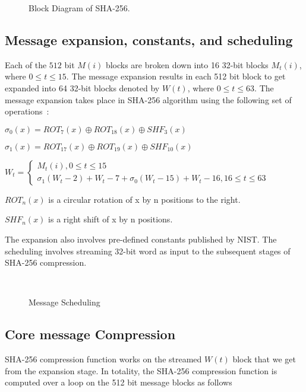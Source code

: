 \begin{figure}[ht]
	\begin{center}
	\end{center}
	\vspace{-1ex}
	\caption{Block Diagram of SHA-256. 
		\label{SHAblockdiagram}}
	\vspace{-4ex}
\end{figure}


\subsection{Message expansion, constants, and scheduling}
Each of the $512$ bit $M(i)$ blocks are broken down into 16 32-bit blocks $M_{t}(i)$, where $0 \leq t \leq 15$. The message expansion results in each 512 bit block to get expanded into 64 32-bit blocks denoted by $W(t)$, where $0 \leq t \leq 63$. The message expansion takes place in SHA-256 algorithm using the following set of operations~\cite{FPGA}:

$\sigma_{0} (x) = ROT_{7}(x) \oplus ROT_{18}(x) \oplus SHF_{3}(x) $

$\sigma_{1}(x) = ROT_{17}(x) \oplus ROT_{19}(x) \oplus SHF_{10}(x)$
 
$W_{t} = \begin{cases} 
	M_{t}(i), 0 \leq t \leq 15 \\
	\sigma_{1}(W_{t} - 2) + W_{t} − 7 + \sigma_{0}(W_{t} − 15) + W_{t}-16, 16 \leq t \leq 63  
\end{cases}$

$ROT_{n}(x)$ is a circular rotation of x by n positions to the right.

$SHF_{n}(x)$ is a right shift of x by n positions. 

The expansion also involves pre-defined constants published by NIST. The scheduling involves streaming 32-bit word as input to the subsequent stages of SHA-256 compression.
\begin{figure}[ht]
	\begin{center}
	\end{center}
	\vspace{-1ex}
	\caption{Message Scheduling 
		\label{Message Scheduling}}
	\vspace{-4ex} ~\cite{SHA-256}
\end{figure}
\subsection{Core message Compression}
SHA-256 compression function works on the streamed $W(t)$ block that we get from the expansion stage. In totality, the SHA-256 compression function is computed over a loop on the 512 bit message blocks as follows ~\cite{Newcastle}

